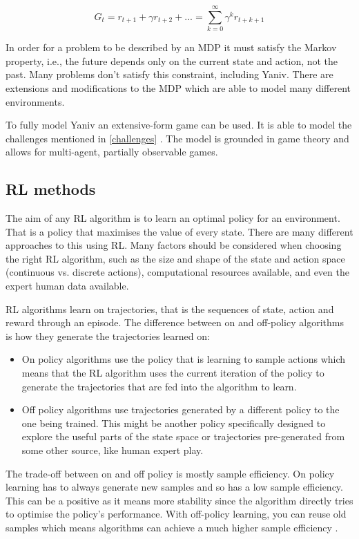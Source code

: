 \documentclass[../main.tex]{subfiles}
\begin{document}
\begin{equation}
G_t = r_{t+1} + \gamma r_{t+2} + ... = \sum_{k=0}^{\infty} \gamma^k r_{t+k+1}
\label{eqn:cumul-reward}
\end{equation}

In order for a problem to be described by an MDP it must satisfy the Markov property, i.e., the future depends only on the current state and action, not the past. Many problems don't satisfy this constraint, including Yaniv. There are extensions and modifications to the MDP which are able to model many different environments.

To fully model Yaniv an extensive-form game can be used. It is able to model the challenges mentioned in \cref{challenges} \cite{jiang_deltadou_2019, heinrich_deep_2016}. The model is grounded in game theory and allows for multi-agent, partially observable games. 

\subsection{RL methods}
The aim of any RL algorithm is to learn an optimal policy for an environment. That is a policy that maximises the value of every state. There are many different approaches to this using RL. Many factors should be considered when choosing the right RL algorithm, such as the size and shape of the state and action space (continuous vs. discrete actions), computational resources available, and even the expert human data available. 

RL algorithms learn on trajectories, that is the sequences of state, action and reward through an episode. The difference between on and off-policy algorithms is how they generate the trajectories learned on:

\begin{itemize}
    \item  On policy algorithms use the policy that is learning to sample actions which means that the RL algorithm uses the current iteration of the policy to generate the trajectories that are fed into the algorithm to learn. 
    \item  Off policy algorithms use trajectories generated by a different policy to the one being trained. This might be another policy specifically designed to explore the useful parts of the state space or trajectories pre-generated from some other source, like human expert play. 
\end{itemize}

The trade-off between on and off policy is mostly sample efficiency. On policy learning has to always generate new samples and so has a low sample efficiency. This can be a positive as it means more stability since the algorithm directly tries to optimise the policy's performance. With off-policy learning, you can reuse old samples which means algorithms can achieve a much higher sample efficiency \cite{sutton_reinforcement_2018}. 
\end{document}
